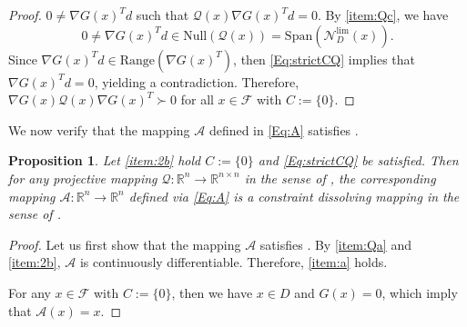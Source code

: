 \documentclass[11pt,a4paper,reqno]{amsart}
\newtheorem{proposition}[theorem]{Proposition}
\begin{document}
{\begin{proof}
        $0\neq \nabla G(x)^T d$ such that $ \mathcal Q(x)\nabla G(x)^Td=0$.
    By  \ref{item:Qc}, we have
    \begin{equation*}
        0\neq \nabla G(x)^T d \in \text{Null} \left(\mathcal Q(x)\right)= \text{Span} \left( \mathcal N_D^{\text{lim}}(x) \right).
    \end{equation*}
    Since $\nabla G(x)^T d \in \text{Range} (\nabla G(x)^T)$, then \eqref{Eq:strictCQ} implies that $\nabla G(x)^T d =0$, yielding a contradiction. Therefore, $\nabla G(x)\mathcal Q(x)\nabla G(x)^T \succ 0$ for all $x\in \mathcal F$ with $C:=\{0\}$.
\end{proof}
We now verify that the mapping $\mathcal A$ defined in \eqref{Eq:A} satisfies . 
\begin{proposition}\label{Eq:validA}
    Let  \ref{item:2b} hold $C:=\{0\}$ and \eqref{Eq:strictCQ} be satisfied. Then for any projective mapping $\mathcal Q:\mathbb R^n\to \mathbb R^{n \times n}$ in the sense of , the corresponding mapping $\mathcal A: \mathbb R^n \to \mathbb R^n$ defined via \eqref{Eq:A} is a constraint dissolving mapping in the sense of .
\end{proposition}
\begin{proof}
    Let us first show that the mapping $\mathcal A$ satisfies . By  \ref{item:Qa} and  \ref{item:2b}, $\mathcal A$ is continuously differentiable. Therefore,  \ref{item:a} holds.

    For any $x\in \mathcal F$ with $C:=\{0\}$, then we have $x\in D$ and $G(x)=0$, which imply that $\mathcal A(x)=x$.


\end{proof}}
\end{document}
